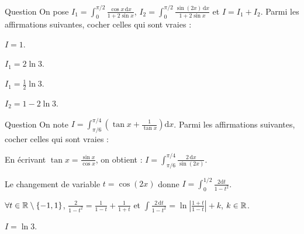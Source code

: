 \begin{multi}[multiple,feedback=
{Dans \(I_2\), on écrit \(\sin (2x)=2\sin x\cos x\). D'où \(\displaystyle I_1+I_2=\int _{0}^{\pi/2}\cos x\,\mathrm{d}x=1\).
\vskip0mm
Avec \(t=1+2\sin x\Rightarrow \mathrm{d}t=2\cos x\, \mathrm{d}x\), on obtient : \(\displaystyle I_1=\int _{1}^{3}\frac{\mathrm{d}t}{2t}=\frac{1}{2}\ln 3\). Enfin, \(I_2=1-I_1\).
}]{Question}
On pose \(\displaystyle I_1=\int _{0}^{\pi/2}\frac{\cos x\,\mathrm{d}x}{1+2\sin x}\), \(\displaystyle I_2=\int _{0}^{\pi/2}\frac{\sin (2x)\,\mathrm{d}x}{1+2\sin x}\) et \(I=I_1+I_2\). Parmi les affirmations suivantes, cocher celles qui sont vraies :

    \item* \(\displaystyle I=1\).
    \item \(\displaystyle I_1=2\ln 3\).
    \item* \(\displaystyle I_1=\frac{1}{2}\ln 3\).
    \item \(\displaystyle I_2=1-2\ln 3\).
\end{multi}


\begin{multi}{Question}
On note \(\displaystyle I=\int _{\pi/6}^{\pi/4}\left(\tan x+\frac{1}{\tan x}\right)\mathrm{d}x\). Parmi les affirmations suivantes, cocher celles qui sont vraies :

    \item* En écrivant \(\displaystyle \tan x=\frac{\sin x}{\cos x}\), on obtient : \(\displaystyle I=\int _{\pi/6}^{\pi/4}\frac{2\, \mathrm{d}x}{\sin (2x)}\).
    \item Le changement de variable \(t=\cos (2x)\) donne \(\displaystyle I=\int _{0}^{1/2}\frac{2\mathrm{d}t}{1-t^2}\).
    \item* \(\forall t\in \mathbb{R}\setminus \{-1,1\}\), \(\displaystyle \frac{2}{1-t^2}=\frac{1}{1-t}+\frac{1}{1+t}\) et \(\displaystyle \int \frac{2\, \mathrm{d}t}{1-t^2}=\ln \left|\frac{1+t}{1-t}\right|+k\), \(k\in \mathbb{R}\).
    \item \(\displaystyle I=\ln 3\).
\end{multi}


